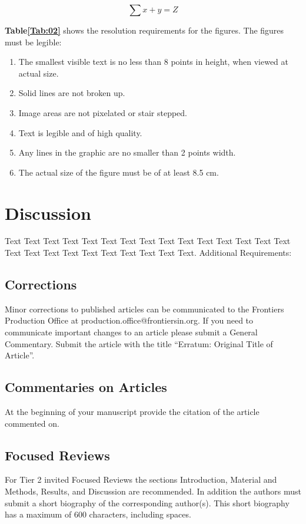 \documentclass{frontiersMED} %
\begin{document}
\begin{equation}
\sum x+ y =Z\label{eq:01}
\end{equation}

\textbf{Table\ref{Tab:02}} shows the resolution requirements for the figures. The figures must be legible:
\begin{enumerate}
\item The smallest visible text is no less than 8 points in height, when viewed at actual size.
\item Solid lines are not broken up.
\item Image areas are not pixelated or stair stepped.
\item Text is legible and of high quality.
\item Any lines in the graphic are no smaller than 2 points width.
\item The actual size of the figure must be of at least 8.5 cm.
\end{enumerate}

\section{Discussion}

Text Text Text Text Text Text  Text Text Text Text Text Text Text Text Text  Text Text Text Text Text Text Text Text Text Text.
Additional Requirements:
\subsection{Corrections}

Minor corrections to published articles can be communicated to the Frontiers Production Office at production.office@frontiersin.org. If you need to communicate important changes to an article please submit a General Commentary. Submit the article with the title “Erratum: Original Title of Article”.

\subsection{Commentaries on Articles}

At the beginning of your manuscript provide the citation of the article commented on.

\subsection{Focused Reviews}

For Tier 2 invited Focused Reviews the sections Introduction, Material and Methods, Results, and Discussion are recommended. In addition the authors must submit a short biography of the corresponding author(s). This short biography has a maximum of 600 characters, including spaces.
\end{document}
